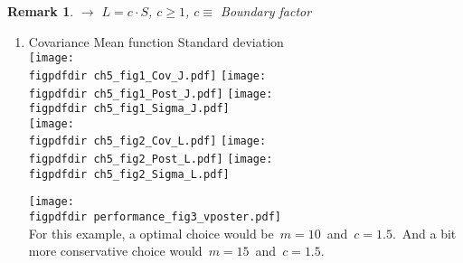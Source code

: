 \documentclass[portrait,a1,final]{a0poster} %
\newtheorem*{remark}{Remark}
\def\figpdfdir{fig/} %
\begin{document}
\begin{minipage}{1\linewidth}
\begin{minipage}[t]{0.48\textwidth}
\vspace{0.2cm}
\begin{remark}
\;\;  $\to$\;\;  $L=c \cdot S$, \hspace{3mm} $c \geqslant 1$, \hspace{1mm} $c \equiv$ {\color{navyblue} Boundary factor}
\end{remark}
\vspace{0.2cm}

\begin{enumerate}
\item {}

\vspace{-2mm}
\hspace{-1cm}
\begin{minipage}{0.70\textwidth}
{\scriptsize \hspace{20mm} Covariance \hspace{35mm} Mean function \hspace{25mm} Standard deviation}\\[-6mm]
%
\texttt{[image: \\figpdfdir ch5\_fig1\_Cov\_J.pdf]}
\texttt{[image: \\figpdfdir ch5\_fig1\_Post\_J.pdf]}
\texttt{[image: \\figpdfdir ch5\_fig1\_Sigma\_J.pdf]}\\
\texttt{[image: \\figpdfdir ch5\_fig2\_Cov\_L.pdf]}
\texttt{[image: \\figpdfdir ch5\_fig2\_Post\_L.pdf]}
\texttt{[image: \\figpdfdir ch5\_fig2\_Sigma\_L.pdf]}

\end{minipage}
\begin{minipage}{0.29\textwidth}

\texttt{[image: \\figpdfdir performance\_fig3\_vposter.pdf]}\\
For this example, a optimal choice would be\, $m=10$\, and\, $c=1.5$.\, And a bit more conservative choice would\, $m=15$\, and\, $c=1.5$.\\
\end{minipage}


\end{enumerate}
\end{minipage}
\end{minipage}
\end{document}
